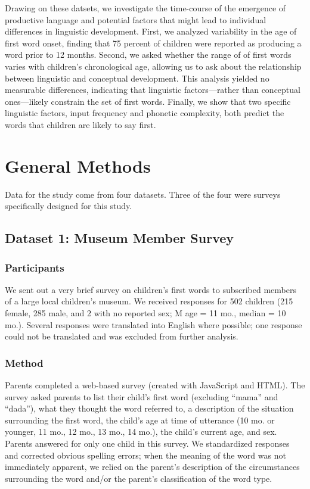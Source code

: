 \documentclass[10pt,letterpaper]{article}
\begin{document}
Drawing on these datsets, we investigate the time-course of the emergence of productive language and potential factors that might lead to individual differences in linguistic development. First, we analyzed variability in the age of first word onset, finding that 75 percent of children were reported as producing a word prior to 12 months. Second, we asked whether the range of of first words varies with children's chronological age, allowing us to ask about the relationship between linguistic and conceptual development. This analysis yielded no measurable differences, indicating that linguistic factors---rather than conceptual ones---likely constrain the set of first words. Finally, we show that two specific linguistic factors, input frequency and phonetic complexity, both predict the words that children are likely to say first.

\section{General Methods}

Data for the study come from four datasets. Three of the four were surveys specifically designed for this study. 

\subsection{Dataset 1: Museum Member Survey}

\subsubsection{Participants}

We sent out a very brief survey on children's first words to subscribed members of a large local children's museum. We received responses for 502 children (215 female, 285 male, and 2 with no reported sex; M age = 11 mo., median = 10 mo.). Several responses were translated into English where possible; one response could not be translated and was excluded from further analysis. 

\subsubsection{Method}

Parents completed a web-based survey (created with JavaScript and HTML). The survey asked parents to list their child's first word (excluding ``mama'' and ``dada''), what they thought the word referred to, a description of the situation surrounding the first word, the child's age at time of utterance (10 mo. or younger, 11 mo., 12 mo., 13 mo., 14 mo.), the child's current age, and sex. Parents answered for only one child in this survey. We standardized responses and corrected obvious spelling errors; when the meaning of the word was not immediately apparent, we relied on the parent's description of the circumstances surrounding the word and/or the parent's classification of the word type.
\end{document}
